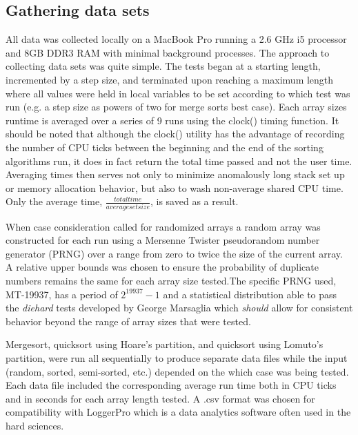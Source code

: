 \documentclass[11pt,letterpaper]{report}
\begin{document}
\subsection*{Gathering data sets}

All data was collected locally on a MacBook Pro running a 2.6 GHz i5 processor and 8GB DDR3 RAM with minimal background processes. The approach to collecting data sets was quite simple. The tests began at a starting length, incremented by a step size, and terminated upon reaching a maximum length where all values were held in local variables to be set according to which test was run (e.g. a step size as powers of two for merge sorts best case). Each array sizes runtime is averaged over a series of 9 runs using the clock() timing function. It should be noted that although the clock() utility has the advantage of recording the number of CPU ticks between the beginning and the end of the sorting algorithms run, it does in fact return the total time passed and not the user time. Averaging times then serves not only to minimize anomalously long stack set up or memory allocation behavior, but also to wash non-average shared CPU time. Only the average time, $\frac{total time}{average set size}$, is saved as a result. 

When case consideration called for randomized arrays a random array was constructed for each run using a Mersenne Twister pseudorandom number generator (PRNG) over a range from zero to twice the size of the current array. A relative upper bounds was chosen to ensure the probability of duplicate numbers remains the same for each array size tested.The specific PRNG used, MT-19937, has a period of $2^{19937}-1$ and a statistical distribution able to pass the \emph{diehard} tests developed by George Marsaglia which \emph{should} allow for consistent behavior beyond the range of array sizes that were tested.

Mergesort, quicksort using Hoare's partition, and quicksort using Lomuto's partition, were run all sequentially to produce separate data files while the input (random, sorted, semi-sorted, etc.) depended on the which case was being tested. Each data file included the corresponding average run time both in CPU ticks and in seconds for each array length tested. A .csv format was chosen for compatibility with LoggerPro which is a data analytics software often used in the hard sciences.
\end{document}
